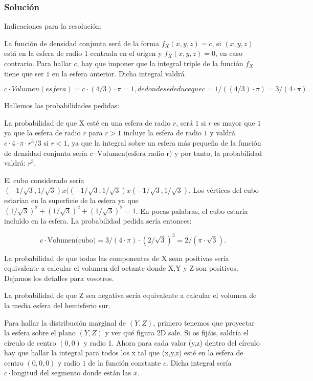 \documentclass[
]{article}
\begin{document}
\hypertarget{soluciuxf3n-3}{%
\subsubsection{Solución}\label{soluciuxf3n-3}}

Indicaciones para la resolución:

La función de densidad conjunta será de la forma \(f_X(x,y,z)=c\), si
\((x,y,z)\) está en la esfera de radio 1 centrada en el origen y
\(f_X(x,y,z)=0\), en caso contrario. Para hallar \(c\), hay que imponer
que la integral triple de la función \(f_X\) tiene que ser \(1\) en la
esfera anterior. Dicha integral valdrá

\[c\cdot Volumen(esfera)=c\cdot (4/3)\cdot \pi=1, de donde se deduce que c=1/((4/3)\cdot \pi)=3/(4\cdot \pi).\]

Hallemos las probabilidades pedidas:

La probabilidad de que X esté en una esfera de radio \(r\), será \(1\)
si \(r\) es mayor que \(1\) ya que la esfera de radio \(r\) para \(r>1\)
incluye la esfera de radio \(1\) y valdrá
\(c\cdot 4\cdot \pi\cdot r^3/3\) si \(r<1\), ya que la integral sobre un
esfera más pequeña de la función de densidad conjunta sería
\(c\cdot \mbox{Volumen(esfera radio r)}\) y por tanto, la probabilidad
valdrá: \(r^3\).

El cubo considerado sería
\((-1/\sqrt{3},1/\sqrt{3})x( (-1/\sqrt{3},1/\sqrt{3})x (-1/\sqrt{3},1/\sqrt{3})\).
Los vértices del cubo estarían en la superficie de la esfera ya que
\((1/\sqrt{3})^2+(1/\sqrt{3})^2+(1/\sqrt{3})^2=1\). En pocas palabras,
el cubo estaría incluído en la esfera. La probabilidad pedida sería
entonces:

\[c\cdot \mbox{Volumen(cubo)}=3/(4\cdot\pi)\cdot (2/\sqrt{3})^3=2/(\pi\cdot \sqrt{3}).\]

La probabilidad de que todas las componentes de X sean positivas sería
equivalente a calcular el volumen del octante donde X,Y y Z son
positivos. Dejamos los detalles para vosotros.

La probabilidad de que Z sea negativa sería equivalente a calcular el
volumen de la media esfera del hemisferio sur.

Para hallar la distribución marginal de \((Y,Z)\), primero tenemos que
proyectar la esfera sobre el plano \((Y,Z)\) y ver qué figura 2D sale.
Si os fijáis, saldría el círculo de centro \((0,0)\) y radio 1. Ahora
para cada valor (y,z) dentro del círculo hay que hallar la integral para
todos los x tal que (x,y,z) esté en la esfera de centro \((0,0,0)\) y
radio \(1\) de la función constante \(c\). Dicha integral sería
\(c\cdot \mbox{longitud del segmento donde están las } x\).
\end{document}
